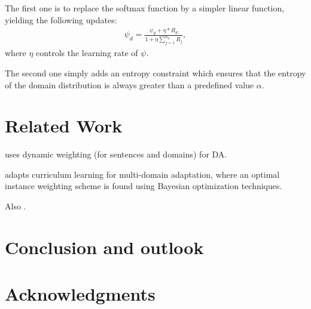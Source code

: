 \documentclass[11pt,a4paper]{article}
\newcommand{\fyTodo}[1]{\Todo[FY:]{\textcolor{orange}{#1}}}
\begin{document}
The first one is to replace the softmax function by a simpler linear function, yielding the following updates:
\begin{align*}
\psi_d = \frac{\psi_d + \eta * R_d}{ 1 + \eta \displaystyle{\mathop{\sum}_{j=1}^{n_d}} R_j},
\end{align*}
where $\eta$ controls the learning rate of $\psi$.

The second one simply adds an entropy constraint which ensures that the entropy of the domain distribution is always greater than a predefined value $\alpha$.\fyTodo{Explain the math}



\section{Related Work \label{sec:related}}
\cite{Wang17instance} uses dynamic weighting (for sentences and domains) for DA.

\cite{Wang20learning-multi} adapts curriculum learning \cite{BengioXX} for multi-domain adaptation, where an optimal instance weighting scheme is found using Bayesian optimization techniques.

Also \cite{Saunders19adaptive}.

\section{Conclusion and outlook \label{sec:discussion}}
\section*{Acknowledgments}


\end{document}
